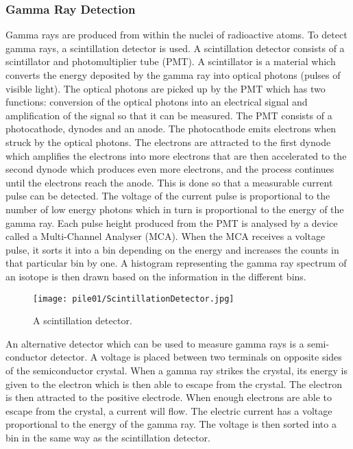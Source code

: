 \documentclass[twoside,titlepage,11pt,twocolumn,a4paper]{article}
\begin{document}
\subsubsection{Gamma Ray Detection}
Gamma rays are produced from within the nuclei of radioactive
atoms. \citep{bushberg1994} To detect gamma rays, a scintillation
detector is used. A scintillation detector consists of a scintillator
and photomultiplier tube (PMT). A scintillator is a material which
converts the energy deposited by the gamma ray into optical photons
(pulses of visible light). The optical photons are picked up by the
PMT which has two functions: conversion of the optical photons into an
electrical signal and amplification of the signal so that it can be
measured. The PMT consists of a photocathode, dynodes and an
anode. The photocathode emits electrons when struck by the optical
photons.  The electrons are attracted to the first dynode which
amplifies the electrons into more electrons that are then accelerated
to the second dynode which produces even more electrons, and the
process continues until the electrons reach the anode. This is done so
that a measurable current pulse can be detected. The voltage of the
current pulse is proportional to the number of low energy photons
which in turn is proportional to the energy of the gamma ray. Each
pulse height produced from the PMT is analysed by a device called a
Multi-Channel Analyser (MCA). When the MCA receives a voltage pulse,
it sorts it into a bin depending on the energy and increases the
counts in that particular bin by one. A histogram representing the
gamma ray spectrum of an isotope is then drawn based on the
information in the different bins. \citep{medalia2007,bushberg1994}

\begin{figure}
  \texttt{[image: pile01/ScintillationDetector.jpg]}
  \caption{A scintillation detector. \citep{nucsafe}}
\end{figure}

An alternative detector which can be used to measure gamma rays is a
semi-conductor detector. A voltage is placed between two terminals on
opposite sides of the semiconductor crystal. \citep{bushberg1994} When
a gamma ray strikes the crystal, its energy is given to the electron
which is then able to escape from the crystal. The electron is then
attracted to the positive electrode. When enough electrons are able to
escape from the crystal, a current will flow. The electric current has
a voltage proportional to the energy of the gamma ray. The voltage is
then sorted into a bin in the same way as the scintillation
detector. \citep{medalia2007,bushberg1994}
\end{document}
